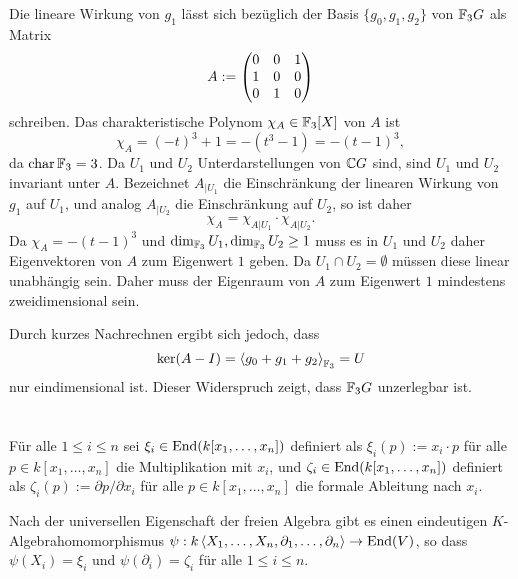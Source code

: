 \documentclass[a4paper,10pt]{article}
\begin{document}
Die lineare Wirkung von $g_1$ lässt sich bezüglich der Basis $\{g_0, g_1, g_2\}$ von $\mathbb{F}_3 G$ als Matrix
\[
 A := \begin{pmatrix}0 & 0 & 1 \\ 1 & 0 & 0 \\ 0 & 1 & 0\end{pmatrix}
\]
schreiben. Das charakteristische Polynom $\chi_A \in \mathbb{F}_3[X]$ von $A$ ist
\[
 \chi_A = (-t)^3 + 1 = -\left(t^3-1\right) = -(t-1)^3,
\]
da $\operatorname{char} \mathbb{F}_3 = 3$. Da $U_1$ und $U_2$ Unterdarstellungen von $\mathbb{C} G$ sind, sind $U_1$ und $U_2$ invariant unter $A$. Bezeichnet $A_{|U_1}$ die Einschränkung der linearen Wirkung von $g_1$ auf $U_1$, und analog $A_{|U_2}$ die Einschränkung auf $U_2$, so ist daher
\[
 \chi_A = \chi_{A|U_1} \cdot \chi_{A|U_2}.
\]
Da $\chi_A = -(t-1)^3$ und $\dim_{\mathbb{F}_3} U_1, \dim_{\mathbb{F}_3} U_2 \geq 1$ muss es in $U_1$ und $U_2$ daher Eigenvektoren von $A$ zum Eigenwert $1$ geben. Da $U_1 \cap U_2 = \emptyset$ müssen diese linear unabhängig sein. Daher muss der Eigenraum von $A$ zum Eigenwert $1$ mindestens zweidimensional sein.

Durch kurzes Nachrechnen ergibt sich jedoch, dass
\[
 \ker (A-I) = \left\langle g_0 + g_1 + g_2 \right\rangle_{\mathbb{F}_3} = U
\]
nur eindimensional ist. Dieser Widerspruch zeigt, dass $\mathbb{F}_3 G$ unzerlegbar ist.



\section{}


\subsection{}
Für alle $1 \leq i \leq n$ sei $\xi_i \in \operatorname{End}(k[x_1, \ldots, x_n])$ definiert als $\xi_i(p) := x_i \cdot p$ für alle $p \in k[x_1, \ldots, x_n]$ die Multiplikation mit $x_i$, und $\zeta_i \in \operatorname{End}(k[x_1, \ldots, x_n])$ definiert als $\zeta_i(p) := \partial p / \partial x_i$ für alle $p \in k[x_1, \ldots, x_n]$ die formale Ableitung nach $x_i$.

Nach der universellen Eigenschaft der freien Algebra gibt es einen eindeutigen $K$-Algebrahomomorphismus $\psi : k\left\langle X_1, \ldots, X_n, \partial_1, \ldots, \partial_n \right\rangle \to \operatorname{End}(V)$, so dass $\psi(X_i) = \xi_i$ und $\psi(\partial_i) = \zeta_i$ für alle $1 \leq i \leq n$.
\end{document}
